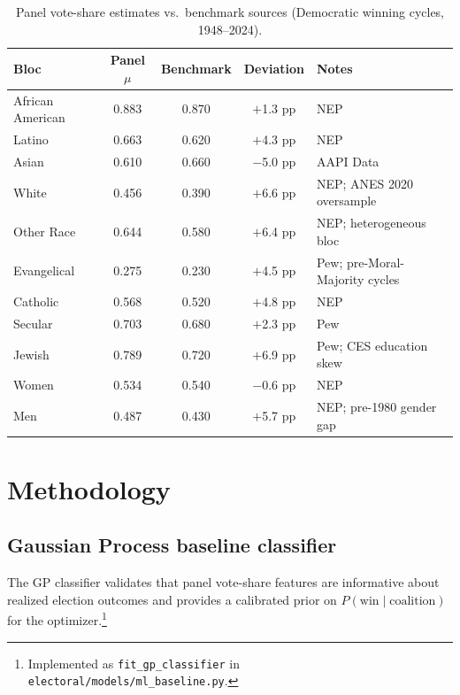 \documentclass[12pt, letterpaper]{article}
\theoremstyle{definition}
\begin{document}
\begin{table}[h]
\centering
\caption{Panel vote-share estimates vs.\ benchmark sources (Democratic winning cycles, 1948--2024).}
\label{tab:benchmarks}
\begin{tabular}{lcccl}
\toprule
Bloc & Panel $\mu$ & Benchmark & Deviation & Notes \\
\midrule
African American & 0.883 & 0.870 & $+$1.3 pp & NEP \\
Latino           & 0.663 & 0.620 & $+$4.3 pp & NEP \\
Asian            & 0.610 & 0.660 & $-$5.0 pp & AAPI Data \\
White            & 0.456 & 0.390 & $+$6.6 pp & NEP; ANES 2020 oversample \\
Other Race       & 0.644 & 0.580 & $+$6.4 pp & NEP; heterogeneous bloc \\
\midrule
Evangelical      & 0.275 & 0.230 & $+$4.5 pp & Pew; pre-Moral-Majority cycles \\
Catholic         & 0.568 & 0.520 & $+$4.8 pp & NEP \\
Secular          & 0.703 & 0.680 & $+$2.3 pp & Pew \\
Jewish           & 0.789 & 0.720 & $+$6.9 pp & Pew; CES education skew \\
\midrule
Women            & 0.534 & 0.540 & $-$0.6 pp & NEP \\
Men              & 0.487 & 0.430 & $+$5.7 pp & NEP; pre-1980 gender gap \\
\bottomrule
\end{tabular}
\end{table}

\section{Methodology}
\label{sec:methods}

\subsection{Gaussian Process baseline classifier}
\label{sec:gp}

The GP classifier validates that panel vote-share features are informative
about realized election outcomes and provides a calibrated prior on
$P(\text{win} \mid \text{coalition})$ for the optimizer.\footnote{Implemented
as \texttt{fit\_gp\_classifier} in \texttt{electoral/models/ml\_baseline.py}.}
\end{document}
